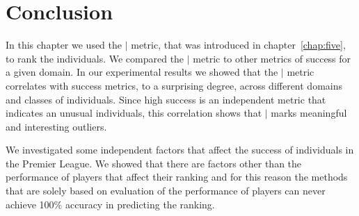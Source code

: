 			
\section{Conclusion}
In this chapter we used the $\mid$ metric, that was introduced in chapter~\ref{chap:five}, to rank the individuals. We compared the $\mid$ metric to other metrics of success for a given domain.
In our experimental results we showed that the $\mid$ metric correlates with success metrics, to a surprising degree, across different domains and classes of individuals. Since high success is an independent metric that indicates an unusual individuals, this correlation shows that $\mid$ marks meaningful and interesting outliers.

We investigated some independent factors that affect the success of individuals in the Premier League. We showed that there are factors other than the performance of players that affect their ranking and for this reason the methods that are solely based on evaluation of the performance of players can never achieve 100$\%$ accuracy in predicting the ranking. 




